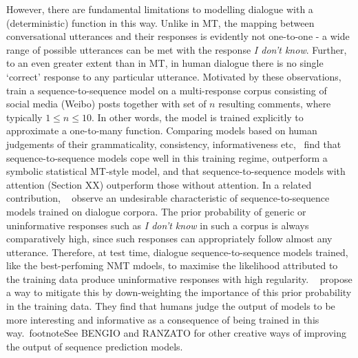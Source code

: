 \documentclass[11pt,letterpaper]{article}
\begin{document}
However, there are fundamental limitations to modelling dialogue with a (deterministic) function in this way. Unlike in MT, the mapping between conversational utterances and their responses is evidently not one-to-one - a wide range of possible utterances can be met with the response \emph{I don't know}. Further, to an even greater extent than in MT, in human dialogue there is no single `correct' response to any particular utterance. Motivated by these observations,~\cite{shang2015neural} train a sequence-to-sequence model on a multi-response corpus consisting of social media (Weibo) posts together with set of \(n\) resulting comments, where typically \( 1 \leq n \leq 10\). In other words, the model is trained explicitly to approximate a one-to-many function. Comparing models based on human judgements of their grammaticality, consistency, informativeness etc,~\cite{shang2015neural} find that sequence-to-sequence models cope well in this training regime, outperform a symbolic statistical MT-style model, and that sequence-to-sequence models with attention (Section XX) outperform those without attention. In a related contribution, ~ observe an undesirable characteristic of sequence-to-sequence models trained on dialogue corpora. The prior probability of generic or uninformative responses such as \emph{I don't know} in such a corpus is always comparatively high, since such responses can appropriately follow almost any utterance. Therefore, at test time, dialogue sequence-to-sequence models trained, like the best-perfoming NMT mdoels, to maximise the likelihood attributed to the training data produce uninformative responses with high regularity. ~ propose a way to mitigate this by down-weighting the importance of this prior probability in the training data. They find that humans judge the output of models to be more interesting and informative as a consequence of being trained in this way.~footnote{See BENGIO and RANZATO for other creative ways of improving the output of sequence prediction models}. 
\end{document}
